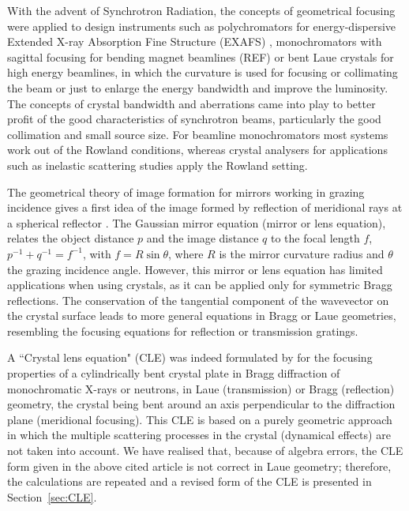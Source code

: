 \documentclass{iucr}              %
\newcommand{\inred}[1]{{\color{red}#1}}
\begin{document}
With the advent of Synchrotron Radiation, the concepts of geometrical focusing were applied to design instruments such as polychromators for energy-dispersive Extended X-ray Absorption Fine Structure (EXAFS) \cite{Tolentino:ms0206}, monochromators with sagittal focusing for bending magnet beamlines \inred{(REF)} or bent Laue crystals for high energy beamlines, in which the curvature is used for focusing or collimating the beam or just to enlarge the energy bandwidth and improve the luminosity. The concepts of crystal bandwidth and aberrations came into play to better profit of the good characteristics of synchrotron beams, particularly the good collimation and small source size. For beamline monochromators  most systems work out of the Rowland conditions, whereas crystal analysers for applications such as inelastic scattering studies apply the Rowland setting.

The geometrical theory of image formation for mirrors working in grazing incidence gives a first idea of the image formed by reflection of meridional rays at a spherical reflector \cite{KB1948}. The Gaussian mirror equation (mirror or lens equation), relates the object distance $p$ and the image distance $q$ to the focal length $f$, $p^{-1}+q^{-1}=f^{-1}$, with $f=R \sin\theta$, where $R$ is the mirror curvature radius and $\theta$ the grazing incidence angle. However, this mirror or lens equation has limited applications when using crystals, as it can be applied only for symmetric Bragg reflections. The conservation of the tangential component of the wavevector on the crystal surface leads to more general equations in Bragg or Laue geometries, resembling the focusing equations for reflection or transmission gratings.

A ``Crystal lens equation" (CLE) was indeed formulated by \cite{CK} for the focusing properties of a cylindrically bent crystal plate in Bragg diffraction of monochromatic X-rays or neutrons, in Laue (transmission) or Bragg (reflection) geometry, the crystal being bent around an axis perpendicular to the diffraction plane (meridional focusing). This CLE is based on a purely geometric approach in which the multiple scattering processes in the crystal (dynamical effects) are not taken into account. We have realised that, because of  algebra errors, the CLE form given in the above cited article is not correct in Laue geometry; therefore, the calculations are repeated and a revised form of the CLE is presented in Section~\ref{sec:CLE}.
\end{document}

